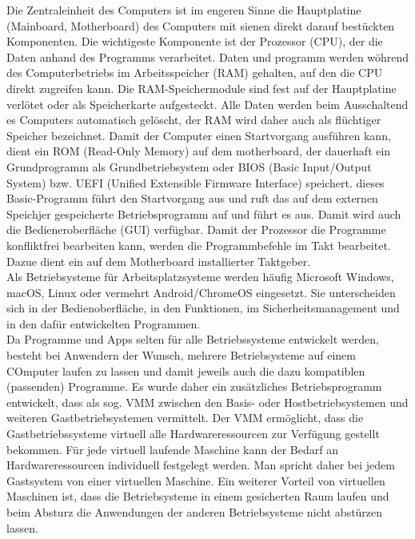 \documentclass[a4paper, 12pt]{report}
\begin{document}
Die Zentraleinheit des Computers ist im engeren Sinne die Hauptplatine 
(Mainboard, Motherboard) des Computers mit sienen direkt darauf bestückten 
Komponenten. Die wichtigeste Komponente ist der Prozessor (CPU), der die Daten
anhand des Programms verarbeitet. Daten und programm werden wöhrend des 
Computerbetriebs im Arbeitsspeicher (RAM) gehalten, auf den die CPU direkt 
zugreifen kann. %
Die RAM-Speichermodule sind fest auf der Hauptplatine verlötet oder als 
Speicherkarte aufgesteckt. Alle Daten werden beim Ausschaltend es Computers 
automatisch gelöscht, der RAM wird daher auch als flüchtiger Speicher 
bezeichnet. %
Damit der Computer einen Startvorgang ausführen kann, dient ein ROM (Read-Only 
Memory) auf dem motherboard, der dauerhaft ein Grundprogramm als 
Grundbetriebsystem oder BIOS (Basic Input/Output System) bzw. UEFI (Unified 
Extensible Firmware Interface) speichert. dieses Basic-Programm führt den 
Startvorgang aus und ruft das auf dem externen Speichjer gespeicherte 
Betriebsprogramm auf und führt es aus. Damit wird auch die Bedieneroberfläche 
(GUI) verfügbar. Damit der Prozessor die Programme konfliktfrei bearbeiten kann, 
werden die Programmbefehle im Takt bearbeitet. Dazue dient ein auf dem 
Motherboard installierter Taktgeber. \\

Als Betriebsysteme für Arbeitsplatzsysteme werden häufig Microsoft Windows, 
macOS, Linux oder vermehrt Android/ChromeOS eingesetzt. Sie unterscheiden sich 
in der Bedienoberfläche, in den Funktionen, im Sicherheitsmanagement und in den 
dafür entwickelten Programmen. \\

Da Programme und Apps selten für alle Betriebssysteme entwickelt werden, besteht
bei Anwendern der Wunsch, mehrere Betriebsysteme auf einem COmputer laufen zu 
lassen und damit jeweils auch die dazu kompatiblen (passenden) Programme. Es 
wurde daher ein zusätzliches Betriebsprogramm entwickelt, dass als sog. VMM 
zwischen den Basis- oder Hostbetriebsystemen und weiteren Gastbetriebsystemen 
vermittelt. Der VMM ermöglicht, dass die Gastbetriebssysteme virtuell alle 
Hardwareressourcen zur Verfügung gestellt bekommen. Für jede virtuell laufende 
Maschine kann der Bedarf an Hardwareressourcen individuell festgelegt werden. 
Man spricht daher bei jedem Gastsystem von einer virtuellen Maschine. Ein 
weiterer Vorteil von virtuellen Maschinen ist, dass die Betriebsysteme in einem 
gesicherten Raum laufen und beim Absturz die Anwendungen der anderen 
Betriebsysteme nicht abstürzen lassen. 
\end{document}
